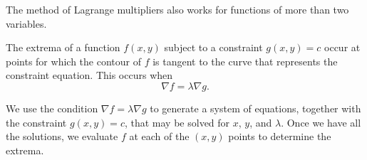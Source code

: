 

The method of Lagrange multipliers also works for functions of more than two variables.



\newpage

\begin{summary}
\item The extrema of a function $f(x,y)$ subject to a constraint
  $g(x,y) = c$ occur at points for which the contour of $f$ is tangent to the curve that represents the constraint equation. This occurs when 
  $$
  \nabla f = \lambda \nabla g.
  $$

\item We use the condition  $\nabla f = \lambda \nabla g$ to generate a system of equations, together
  with the constraint $g(x,y) = c$, that may be
  solved for $x$, $y$, and $\lambda$.  Once we have all the solutions, we evaluate $f$
  at each of the $(x,y)$ points to determine the extrema.
\end{summary}




\nin \hrulefill



\clearpage
